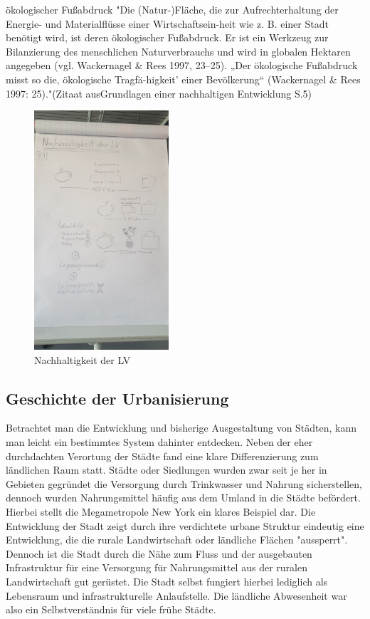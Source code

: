 \documentclass{article}
\begin{document}
ökologischer Fußabdruck
"Die (Natur-)Fläche, die zur Aufrechterhaltung der Energie- und Materialflüsse einer Wirtschaftsein-heit wie z. B. einer Stadt benötigt wird, ist deren ökologischer Fußabdruck. Er ist ein Werkzeug zur Bilanzierung des menschlichen Naturverbrauchs und wird in globalen Hektaren angegeben (vgl. Wackernagel & Rees 1997, 23–25). „Der ökologische Fußabdruck misst so die‚ ökologische Tragfä-higkeit’ einer Bevölkerung“ (Wackernagel & Rees 1997: 25)."(Zitaat ausGrundlagen einer nachhaltigen Entwicklung S.5)

\begin{figure}[htp]
\centering
\includegraphics[width=5cm]{image_folder/skizze1.jpg}
\caption{Nachhaltigkeit der LV}
\label{fig:Skizze_Nachhaltigkeit}
\end{figure}

\subsection{Geschichte der Urbanisierung}

Betrachtet man die Entwicklung und bisherige Ausgestaltung von Städten, kann man leicht ein bestimmtes System dahinter entdecken.
Neben der eher durchdachten Verortung der Städte fand eine klare Differenzierung zum ländlichen Raum statt. Städte oder Siedlungen wurden
zwar seit je her in Gebieten gegründet die Versorgung durch Trinkwasser und Nahrung sicherstellen, dennoch wurden Nahrungsmittel häufig
aus dem Umland in die Städte befördert. Hierbei stellt die Megametropole New York ein klares Beispiel dar. Die Entwicklung der Stadt zeigt
durch ihre verdichtete urbane Struktur eindeutig eine Entwicklung, die die rurale Landwirtschaft oder ländliche Flächen "aussperrt". Dennoch
ist die Stadt durch die Nähe zum Fluss und der ausgebauten Infrastruktur für eine Versorgung für Nahrungsmittel aus der ruralen Landwirtschaft
gut gerüstet. Die Stadt selbst fungiert hierbei lediglich als Lebensraum und infrastrukturelle Anlaufstelle.
Die ländliche Abwesenheit war also ein Selbstverständnis für viele frühe Städte.
\end{document}
